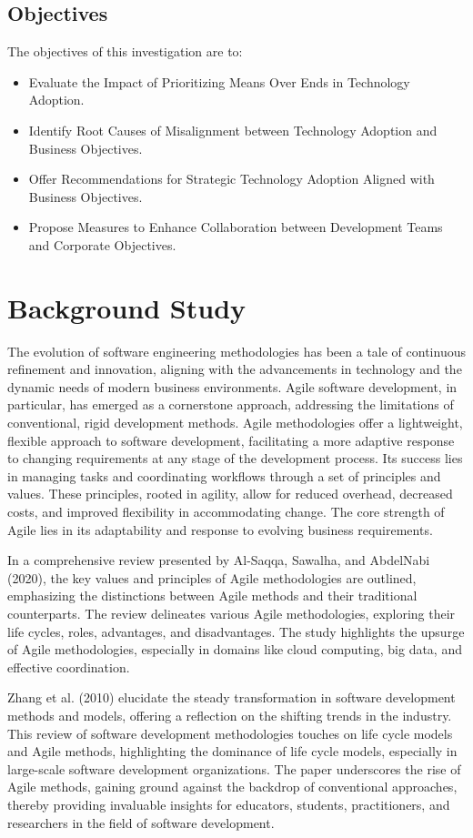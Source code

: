 \documentclass[a4Paper]{article}
\begin{document}
\subsection{Objectives}
The objectives of this investigation are to:
\begin{itemize}
\item Evaluate the Impact of Prioritizing Means Over Ends in Technology Adoption.
\item Identify Root Causes of Misalignment between Technology Adoption and Business Objectives.
\item Offer Recommendations for Strategic Technology Adoption Aligned with Business Objectives.
\item Propose Measures to Enhance Collaboration between Development Teams and Corporate Objectives.
\end{itemize}
\pagebreak

\section{Background Study}
The evolution of software engineering methodologies has been a tale of continuous refinement and innovation, aligning with the advancements in technology and the dynamic needs of modern business environments. Agile software development, in particular, has emerged as a cornerstone approach, addressing the limitations of conventional, rigid development methods. Agile methodologies offer a lightweight, flexible approach to software development, facilitating a more adaptive response to changing requirements at any stage of the development process. Its success lies in managing tasks and coordinating workflows through a set of principles and values. These principles, rooted in agility, allow for reduced overhead, decreased costs, and improved flexibility in accommodating change. The core strength of Agile lies in its adaptability and response to evolving business requirements.

In a comprehensive review presented by Al-Saqqa, Sawalha, and AbdelNabi (2020)\cite{al2020agile}, the key values and principles of Agile methodologies are outlined, emphasizing the distinctions between Agile methods and their traditional counterparts. The review delineates various Agile methodologies, exploring their life cycles, roles, advantages, and disadvantages. The study highlights the upsurge of Agile methodologies, especially in domains like cloud computing, big data, and effective coordination.

Zhang et al. (2010)\cite{zhang2010software} elucidate the steady transformation in software development methods and models, offering a reflection on the shifting trends in the industry. This review of software development methodologies touches on life cycle models and Agile methods, highlighting the dominance of life cycle models, especially in large-scale software development organizations. The paper underscores the rise of Agile methods, gaining ground against the backdrop of conventional approaches, thereby providing invaluable insights for educators, students, practitioners, and researchers in the field of software development.
\end{document}
